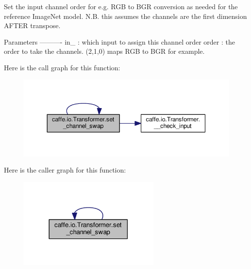 \begin{DoxyVerb}Set the input channel order for e.g. RGB to BGR conversion
as needed for the reference ImageNet model.
N.B. this assumes the channels are the first dimension AFTER transpose.

Parameters
----------
in_ : which input to assign this channel order
order : the order to take the channels.
    (2,1,0) maps RGB to BGR for example.
\end{DoxyVerb}
 Here is the call graph for this function\+:
\nopagebreak
\begin{figure}[H]
\begin{center}
\leavevmode
\includegraphics[width=344pt]{classcaffe_1_1io_1_1_transformer_abd32a70aebb66e66de7567800547b114_cgraph}
\end{center}
\end{figure}
Here is the caller graph for this function\+:
\nopagebreak
\begin{figure}[H]
\begin{center}
\leavevmode
\includegraphics[width=201pt]{classcaffe_1_1io_1_1_transformer_abd32a70aebb66e66de7567800547b114_icgraph}
\end{center}
\end{figure}
\mbox{\label{classcaffe_1_1io_1_1_transformer_abd32a70aebb66e66de7567800547b114}} 

